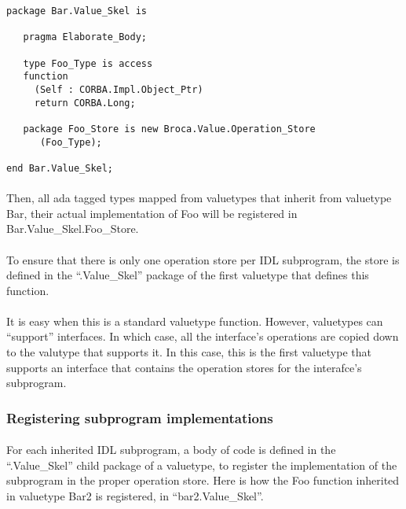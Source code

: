\begin{verbatim}
package Bar.Value_Skel is

   pragma Elaborate_Body;

   type Foo_Type is access 
   function 
     (Self : CORBA.Impl.Object_Ptr)
     return CORBA.Long;

   package Foo_Store is new Broca.Value.Operation_Store
      (Foo_Type);

end Bar.Value_Skel;
\end{verbatim}

\paragraph{}Then, all ada tagged types mapped from valuetypes that
inherit from valuetype Bar, their actual implementation of Foo will be
registered in Bar.Value\_Skel.Foo\_Store.

\paragraph{}To ensure that there is only one operation store per IDL
subprogram, the store is defined in the ``.Value\_Skel'' package of
the first valuetype that defines this function.

\paragraph{} It is easy when this
is a standard valuetype function. However, valuetypes can ``support''
interfaces. In which case, all the interface's operations are copied
down to the valutype that supports it. In this case, this is the first
valuetype that supports an interface that contains the operation
stores for the interafce's subprogram.

\subsubsection{Registering subprogram implementations}
\paragraph{}For each inherited IDL subprogram, a body of code is
defined in the ``.Value\_Skel'' child package of a valuetype, to
register the implementation of the subprogram in the proper operation
store.
Here is how the Foo function inherited in valuetype Bar2 is
registered, in ``bar2.Value\_Skel''.

